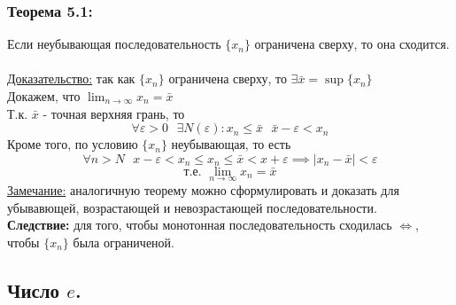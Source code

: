 \documentclass[12pt]{article}
\begin{document}
    \subsubsection*{Теорема 5.1:}
    Если неубывающая последовательность $\{x_n\}$ ограничена сверху, то она сходится.\\\\
    \underline{Доказательство:} так как $\{x_n\}$ ограничена сверху, то $\exists \bar{x} = \sup \{x_n\}$\\
    Докажем, что $\lim_{n\to\infty}x_n = \bar{x}$\\
    Т.к. $\bar{x}$ - точная верхняя грань, то 
    \[
        \forall \varepsilon > 0 \text{ } \exists N(\varepsilon) : x_n \le \bar{x} \text{    } \bar{x} - \varepsilon < x_n
    \]
    Кроме того, по условию $\{x_n\}$ неубывающая, то есть
    \[
        \forall n > N \text{ } x - \varepsilon < x_n \le x_n \le \bar{x} < x + \varepsilon \implies |x_n-\bar{x}| < \varepsilon
    \]
    \[
        \text{т.е. }\lim_{n\to\infty}x_n = \bar{x}
    \]
    \underline{Замечание:} аналогичную теорему можно сформулировать и доказать для убывавющей, возрастающей и невозрастающей последовательности.\\
    \textbf{Следствие:} для того, чтобы монотонная последовательность сходилась $\Leftrightarrow$, чтобы $\{x_n\}$ была ограниченой.\\

    \subsection{Число $e$.}
\end{document}
